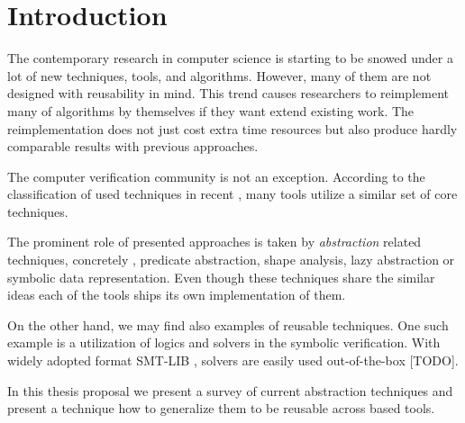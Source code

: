 \chapter{Introduction}
\label{ch:intro}


The contemporary research in computer science is starting to be snowed under a lot of new techniques, tools, and algorithms.
However, many of them are not designed with reusability in mind.
This trend causes researchers to reimplement many of algorithms by themselves if they want extend existing work.
The reimplementation does not just cost extra time resources but also produce hardly comparable results with previous approaches.

The computer verification community is not an exception.
According to the classification of used techniques in recent \svcomp \cite{SVCOMP2019}, many tools utilize a similar set of core techniques.

The prominent role of presented approaches is taken by \emph{abstraction} related techniques, concretely \cegar, predicate abstraction, shape analysis, lazy abstraction or symbolic data representation.
Even though these techniques share the similar ideas each of the tools ships its own implementation of them.


On the other hand, we may find also examples of reusable techniques.
One such example is a utilization of \smt logics and solvers in the symbolic verification.
With widely adopted format SMT-LIB \cite{Barrett2010}, \smt solvers are easily used out-of-the-box [TODO].

In this thesis proposal we present a survey of current abstraction techniques and  present a technique how to generalize them to be reusable across \llvm based tools.




